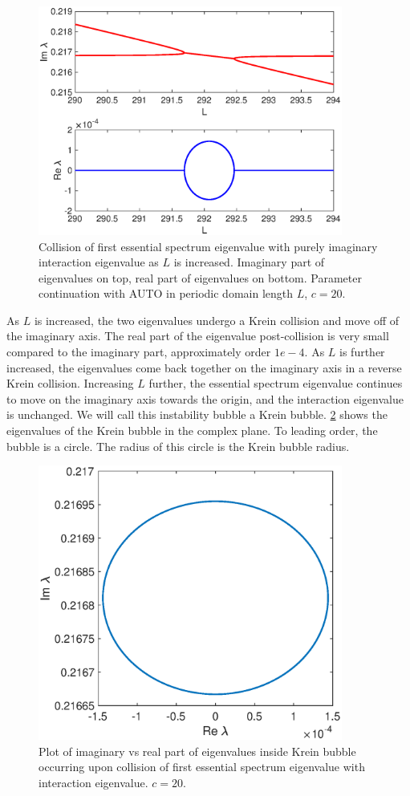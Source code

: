 \documentclass[thesis.tex]{subfiles}
\begin{document}
\begin{figure}
\includegraphics[width=10cm]{images/kdv5numerics/kreinbubble1}
\caption{Collision of first essential spectrum eigenvalue with purely imaginary interaction eigenvalue as $L$ is increased. Imaginary part of eigenvalues on top, real part of eigenvalues on bottom. Parameter continuation with AUTO in periodic domain length $L$, $c = 20$.}
\label{fig:kreinbubble1}
\end{figure}

As $L$ is increased, the two eigenvalues undergo a Krein collision and move off of the imaginary axis. The real part of the eigenvalue post-collision is very small compared to the imaginary part, approximately order $1e-4$. As $L$ is further increased, the eigenvalues come back together on the imaginary axis in a reverse Krein collision. Increasing $L$ further, the essential spectrum eigenvalue continues to move on the imaginary axis towards the origin, and the interaction eigenvalue is unchanged. We will call this instability bubble a Krein bubble. \cref{fig:kreinbubble1zoom} shows the eigenvalues of the Krein bubble in the complex plane. To leading order, the bubble is a circle. The radius of this circle is the Krein bubble radius.

\begin{figure}
\includegraphics[width=10cm]{images/kdv5numerics/kreinbubble1zoom}
\caption{Plot of imaginary vs real part of eigenvalues inside Krein bubble occurring upon collision of first essential spectrum eigenvalue with interaction eigenvalue. $c = 20$.}
\label{fig:kreinbubble1zoom}
\end{figure}
\end{document}
